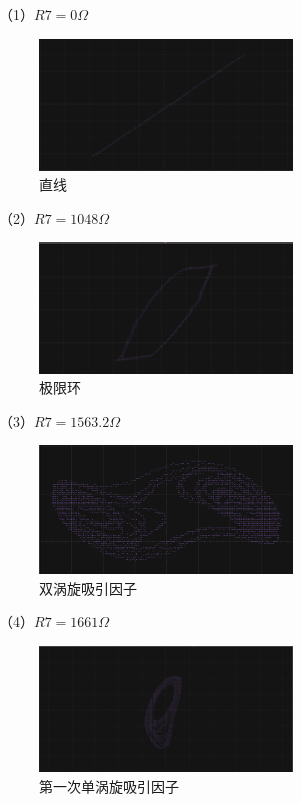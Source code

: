 \documentclass[10pt,a4paper,twoside,UTF8]{ctexart}
\begin{document}
（1）$R7=0\Omega$
\begin{figure}[H]
	\centering
	\includegraphics[width=0.6\textwidth]{chua_sim/straight.png}
	\caption{直线}	
\end{figure}
（2）$R7=1048\Omega$
\begin{figure}[H]
	\centering
	\includegraphics[width=0.6\textwidth]{chua_sim/limit.png}
	\caption{极限环}	
\end{figure}
（3）$R7=1563.2\Omega$
\begin{figure}[H]
	\centering
	\includegraphics[width=0.6\textwidth]{chua_sim/double.png}
	\caption{双涡旋吸引因子}	
\end{figure}
（4）$R7=1661\Omega$
\begin{figure}[H]
	\centering
	\includegraphics[width=0.6\textwidth]{chua_sim/1.png}
	\caption{第一次单涡旋吸引因子}	
\end{figure}
\end{document}
